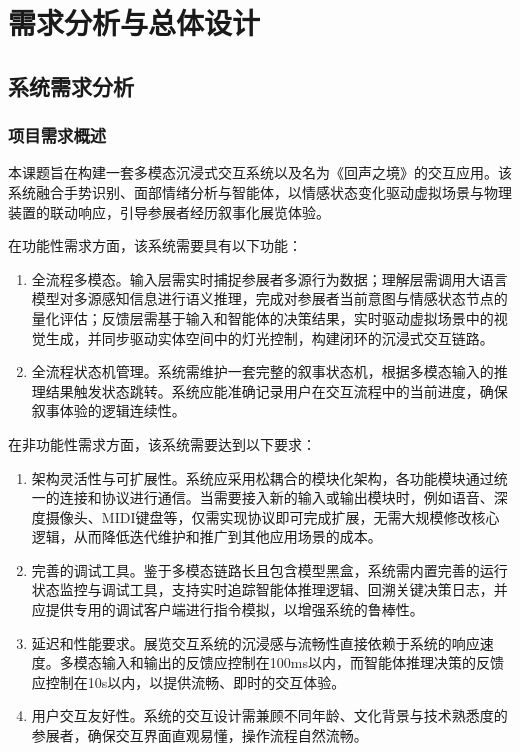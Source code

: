 \documentclass[bachelor]{njupthesis}
\begin{document}
\chapter{需求分析与总体设计}

\section{系统需求分析}

\subsection{项目需求概述}
本课题旨在构建一套多模态沉浸式交互系统以及名为《回声之境》的交互应用。该系统融合手势识别、面部情绪分析与智能体，以情感状态变化驱动虚拟场景与物理装置的联动响应，引导参展者经历叙事化展览体验。 

在功能性需求方面，该系统需要具有以下功能：

\begin{enumerate}
\item 全流程多模态。输入层需实时捕捉参展者多源行为数据；理解层需调用大语言模型对多源感知信息进行语义推理，完成对参展者当前意图与情感状态节点的量化评估；反馈层需基于输入和智能体的决策结果，实时驱动虚拟场景中的视觉生成，并同步驱动实体空间中的灯光控制，构建闭环的沉浸式交互链路。
\item 全流程状态机管理。系统需维护一套完整的叙事状态机，根据多模态输入的推理结果触发状态跳转。系统应能准确记录用户在交互流程中的当前进度，确保叙事体验的逻辑连续性。
\end{enumerate}

在非功能性需求方面，该系统需要达到以下要求：

\begin{enumerate}
\item 架构灵活性与可扩展性。系统应采用松耦合的模块化架构，各功能模块通过统一的连接和协议进行通信。当需要接入新的输入或输出模块时，例如语音、深度摄像头、MIDI键盘等，仅需实现协议即可完成扩展，无需大规模修改核心逻辑，从而降低迭代维护和推广到其他应用场景的成本。
\item 完善的调试工具。鉴于多模态链路长且包含模型黑盒，系统需内置完善的运行状态监控与调试工具，支持实时追踪智能体推理逻辑、回溯关键决策日志，并应提供专用的调试客户端进行指令模拟，以增强系统的鲁棒性。
\item 延迟和性能要求。展览交互系统的沉浸感与流畅性直接依赖于系统的响应速度。多模态输入和输出的反馈应控制在100ms以内，而智能体推理决策的反馈应控制在10s以内，以提供流畅、即时的交互体验。
\item 用户交互友好性。系统的交互设计需兼顾不同年龄、文化背景与技术熟悉度的参展者，确保交互界面直观易懂，操作流程自然流畅。
\end{enumerate}
\end{document}
